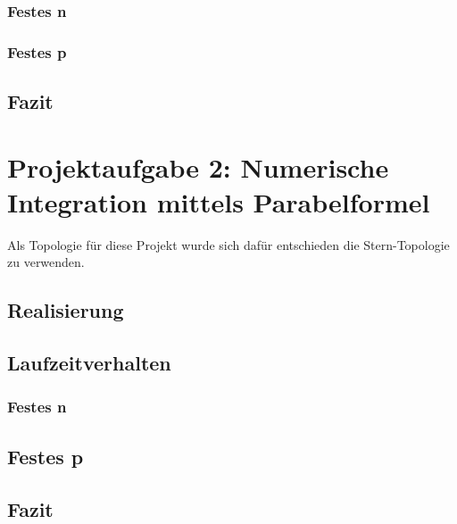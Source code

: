 \subsubsection{Festes n}
\subsubsection{Festes p}

\subsection{Fazit}

\section{Projektaufgabe 2: Numerische Integration mittels Parabelformel}
Als Topologie für diese Projekt wurde sich dafür entschieden die Stern-Topologie zu verwenden.


\subsection{Realisierung}


\subsection{Laufzeitverhalten}
\subsubsection{Festes n}
\subsection{Festes p}

\subsection{Fazit}



